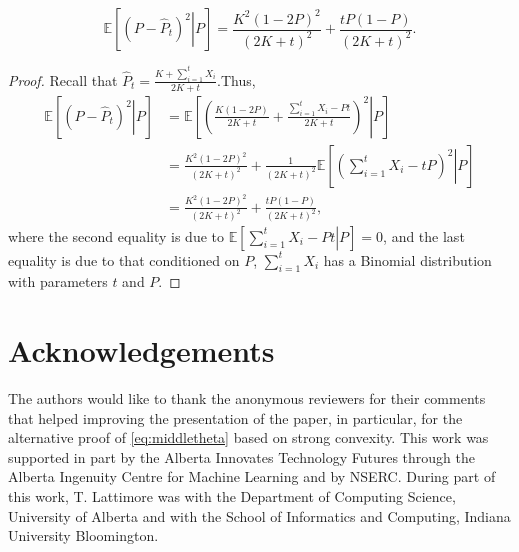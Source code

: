 \documentclass[english]{article}
\newcommand{\Expc}[2]{\mathbb{E}\left[ \left. #1 \right| #2 \right]}
\begin{document}
\begin{lemma}
	\label{lem:bayeserror}
	\[
	\Expc{(P-\hat{P}_t)^2}{P} = \frac{K^2(1-2P)^2}{(2K+t)^2} + \frac{tP(1-P)}{(2K+t)^2}.
	\]
\end{lemma}
\begin{proof}
	Recall that $\hat P_t = \frac{K+\sum_{i=1}^{t}X_i}{2K+t}$.Thus, 
	\begin{align*}
	\Expc{(P-\hat{P}_t)^2}{P} & = \Expc{\left(\frac{K(1-2P)}{2K+t} + \frac{\sum_{i=1}^{t}X_i- Pt}{2K+t}\right)^2}{P} \\
	& = \frac{K^2(1-2P)^2}{(2K+t)^2} + \frac{1}{(2K+t)^2}\Expc{ \left(\sum_{i=1}^{t}X_i - tP\right)^2}{P} \\
	& = \frac{K^2(1-2P)^2}{(2K+t)^2} + \frac{tP(1-P)}{(2K+t)^2},
	\end{align*}
	where the second equality is due to $\Expc{ \sum_{i=1}^{t}X_i - Pt}{P} =0$, and the last equality is due to that conditioned on $P$, $\sum_{i=1}^{t}X_i$ has a Binomial distribution with parameters $t$ and $P$.
\end{proof}

\section*{Acknowledgements}
The authors would like to thank the anonymous reviewers for their comments that helped improving the presentation of the paper, in particular, for the alternative proof of \eqref{eq:middletheta} based on strong convexity. This work was supported in part by the Alberta Innovates Technology Futures through the Alberta Ingenuity Centre for Machine Learning and by NSERC.
During part of this work, T. Lattimore was with the Department of Computing Science, University of Alberta and with the  School of Informatics and Computing, Indiana University  Bloomington.

\setlength{\bibsep}{0.4\bibsep}

%
%
%
\end{document}

